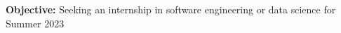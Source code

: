 

\textbf{Objective:} Seeking an internship in software engineering or data science for Summer 2023
